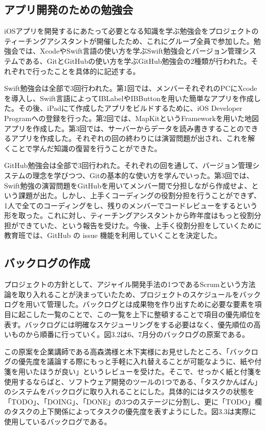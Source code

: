 \documentclass[openany,11pt,papersize]{jsbook}
\begin{document}

\subsection{アプリ開発のための勉強会}
\par iOSアプリを開発するにあたって必要となる知識を学ぶ勉強会をプロジェクトのティーチングアシスタントが開催したため、これにグループ全員で参加した。勉強会では、XcodeやSwift言語の使い方を学ぶSwift勉強会とバージョン管理システムである、GitとGitHubの使い方を学ぶGitHub勉強会の2種類が行われた。それぞれで行ったことを具体的に記述する。
\par Swift勉強会は全部で3回行われた。第1回では、メンバーそれぞれのPCにXcodeを導入し、Swift言語によってIBLabelやIBButtonを用いた簡単なアプリを作成した。その後、iPadにて作成したアプリをビルドするために、iOS Developer Programへの登録を行った。第2回では、MapKitというFrameworkを用いた地図アプリを作成した。第3回では、サーバーからデータを読み書きすることのできるアプリを作成した。それぞれの回の終わりには演習問題が出され、これを解くことで学んだ知識の復習を行うことができた。
\par GitHub勉強会は全部で3回行われた。それぞれの回を通して、バージョン管理システムの理念を学びつつ、Gitの基本的な使い方を学んでいった。第3回では、Swift勉強の演習問題をGitHubを用いてメンバー間で分担しながら作成せよ、という課題が出た。しかし、上手くコーディングの役割分担を行うことができず、1人で全てのコーディングをし、残りのメンバーでコードレビューをするという形を取った。これに対し、ティーチングアシスタントから昨年度はもっと役割分担ができていた、という報告を受けた。今後、上手く役割分担をしていくために教育班では、GitHub の issue 機能を利用していくことを決定した。

\subsection{バックログの作成}
\par プロジェクトの方針として、アジャイル開発手法の1つであるScrumという方法論を取り入れることが決まっていたため、プロジェクトのスケジュールをバックログを用いて管理した。バックログとは成果物を作り出すために必要な要素を項目に起こした一覧のことで、この一覧を上下に整頓することで項目の優先順位を表す。バックログには明確なスケジューリングをする必要はなく、優先順位の高いものから順番に行っていく。図3.2は6、7月分のバックログの原案である。

\par この原案を企業講師である高森満様と木下実様にお見せしたところ、「バックログの優先度を議論する際にもっと手軽に入れ替えることが可能なように、紙や付箋を用いたほうが良い」というレビューを受けた。そこで、せっかく紙と付箋を使用するならばと、ソフトウェア開発のツールの1つである、「タスクかんばん」のシステムをバックログに取り入れることにした。具体的にはタスクの状態を「TODO」、「DOING」、「DONE」の3つのステージに分割し、更に「TODO」欄のタスクの上下関係によってタスクの優先度を表すようにした。図3.3は実際に使用しているバックログである。
\end{document}
